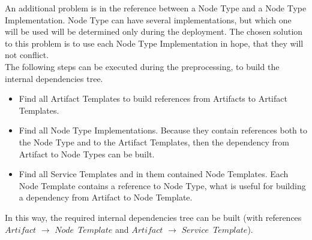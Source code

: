 
An additional problem is in the reference between a Node Type and a Node Type Implementation.
Node Type can have several implementations, but which one will be used will be determined only during the deployment. 
The chosen solution to this problem is to use each Node Type Implementation in hope, that they will not conflict.\\
The following steps can be executed during the preprocessing, to build the internal dependencies tree.
\begin{itemize}
	\item Find all Artifact Templates to build references from Artifacts to Artifact Templates.
	\item Find all Node Type Implementations. Because they contain references both to the Node Type and to the Artifact Templates, then the dependency from Artifact to Node Types can be built.
	\item Find all Service Templates and in them contained Node Templates. Each Node Template contains a reference to Node Type, what is useful for building a dependency from Artifact to Node Template.
\end{itemize} 
In this way, the required internal dependencies tree can be built (with references $Artifact$ $\rightarrow$ $Node$~$Template$ and $Artifact$ $\rightarrow$ $Service$~$Template$).

